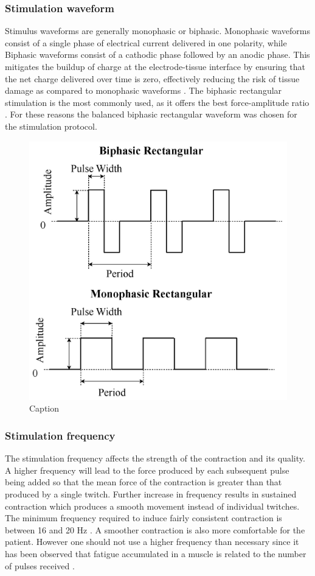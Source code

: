 \subsubsection{Stimulation waveform}
Stimulus waveforms are generally monophasic or biphasic. Monophasic waveforms consist of a single phase of electrical current delivered in one polarity, while Biphasic waveforms consist of a cathodic phase followed by an anodic phase. This mitigates the buildup of charge at the electrode-tissue interface by ensuring that the net charge delivered over time is zero, effectively reducing the risk of tissue damage as compared to monophasic waveforms \cite{peckham_functional_2005}. The biphasic rectangular stimulation is the most commonly used, as it offers the best force-amplitude ratio
\cite{lynch_functional_2008}. For these reasons the balanced biphasic rectangular waveform was chosen for the stimulation protocol.
 \begin{figure} [H]
     \centering
     \includegraphics[width=0.6\linewidth]{images/twowaveform.jpg}
     \caption{Caption}
     \label{fig:enter-label}
 \end{figure}
 

\subsubsection{Stimulation frequency}
The stimulation frequency affects the strength of the contraction and its quality. A higher frequency will lead to the force produced by each subsequent pulse being added so that the mean force of the contraction is greater than that produced by a single twitch. Further increase in frequency results in sustained contraction which produces a smooth movement instead of individual twitches. The minimum frequency required to induce fairly consistent contraction is between 16 and 20 Hz \cite{marquez-chin_functional_2020}. A smoother contraction is also more comfortable for the patient. However one should not use a higher frequency than necessary since it has been observed that fatigue accumulated in a muscle is related to the number of pulses received \cite{bigland-ritchie_muscle_2000}. 

